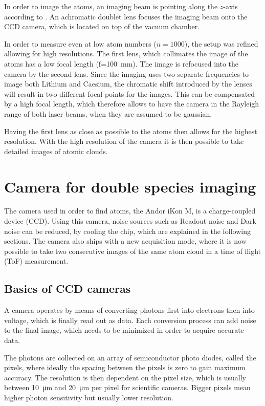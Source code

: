 In order to image the atoms, an imaging beam is pointing along the $z$-axis according to .
An achromatic doublet lens focuses the imaging beam onto the CCD camera, which is located on top of the vacuum chamber.

In order to measure even at low atom numbers ($n=1000$), the setup was refined allowing for high resolutions\cite{Renner2014}. The first lens, which collimates the image of the atoms has a low focal length (f=\SI{100}{\milli\meter}).
The image is refocused into the camera by the second lens. Since the imaging uses two separate frequencies to image both Lithium and Caesium, the chromatic shift introduced by the lenses will result in two different focal points for the images. This can be compensated by a high focal length, which therefore allows to have the camera in the Rayleigh range of both laser beams, when they are assumed to be gaussian.

Having the first lens as close as possible to the atoms then allows for the highest resolution. With the high resolution of the camera it is then possible to take detailed images of atomic clouds.


\section{Camera for double species imaging}
\label{ch:camera}
The camera used in order to find atoms, the Andor iKon M\cite{andorManual}, is a charge-coupled device (CCD). Using this camera, noise sources such as Readout noise and Dark noise can be reduced, by cooling the chip, which are explained in the following sections. The camera also ships with a new acquisition mode, where it is now possible to take two consecutive images of the same atom cloud in a time of flight (ToF) measurement.

\subsection{Basics of CCD cameras}
\label{ch:ccd_basics}

A camera operates by means of converting photons first into electrons then into voltage, which is finally read out as data\cite{ccdoperationUrl}\cite{guppy38Bsheet}. Each conversion process can add noise to the final image, which needs to be minimized in order to acquire accurate data.

The photons are collected on an array of semiconductor photo diodes, called the pixels, where ideally the spacing between the pixels is zero to gain maximum accuracy. The resolution is then dependent on the pixel size, which is usually between \SI{10}{\micro\meter} and \SI{20}{\micro\meter} per pixel for scientific cameras. Bigger pixels mean higher photon sensitivity but usually lower resolution.

